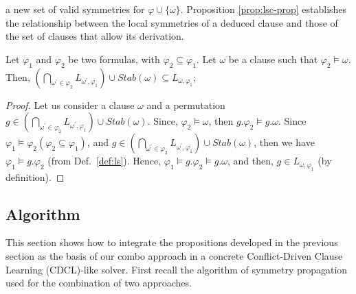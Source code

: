a new set of valid symmetries for $\varphi \cup \{\omega\}$.
\medskip
Proposition \ref{prop:lsc-prop} establishes the relationship between the local symmetries of a deduced clause and those of the set of clauses that allow its derivation. 
\begin{proposition}
 \label{prop:lsc-prop}
 Let $\varphi_1$ and $\varphi_2$ be two formulas, with $\varphi_2 \subseteq \varphi_1$. 
 Let $\omega$ be a clause such that $\varphi_2 \models \omega$. Then, 
 $(\underset{\omega^\prime \in \varphi_2}{\bigcap}L_{\omega^\prime,\varphi_1})
 \cup Stab(\omega) \subseteq L_{\omega,\varphi_1}$;
\end{proposition} 
\begin{proof}
 Let us consider a clause $\omega$ and a permutation $g \in 
 (\underset{\omega^\prime \in \varphi_2}{\bigcap}L_{\omega^\prime,\varphi_1})
 \cup Stab(\omega)$.
 Since, $\varphi_2 \models \omega$, then  $g.\varphi_2 \models g.\omega$. Since $\varphi_1 \models \varphi_2 (\varphi_2 \subseteq \varphi_1)$, and 
 $g \in 
 (\underset{\omega^\prime \in \varphi_2}{\bigcap}L_{\omega^\prime,\varphi_1})
 \cup Stab(\omega)$, then we have $\varphi_1 \models g.\varphi_2$ (from Def.~\ref{def:ls}). Hence, $\varphi_1 \models g.\varphi_2 \models g.\omega$, and then, $g \in L_{\omega,\varphi_1}$ (by definition). 
\end{proof}
\subsection{Algorithm}
This section shows how to integrate the propositions developed in the previous
section as the basis of our combo approach in a concrete
Conflict-Driven Clause Learning (CDCL)-like solver.
First recall the algorithm of symmetry propagation used for the combination of two approaches.



